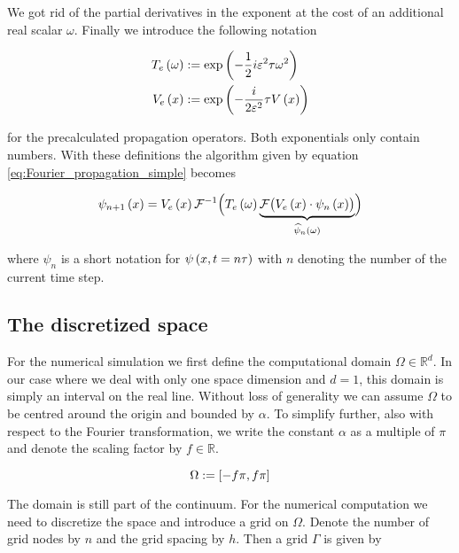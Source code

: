 We got rid of the partial derivatives in the exponent at the cost of an additional
real scalar $\omega$. Finally we introduce the following notation

\begin{equation} \label{eq:def_Fourier_operator_exponentials}
\begin{split}
  T_e\left( \omega \right) & := \exp\left( -\frac{1}{2}i\varepsilon^2\tau\omega^2 \right) \\
  V_e\left( x \right)      & := \exp\left( -\frac{i}{2\varepsilon^2}\tau V\left( x \right) \right)
\end{split}
\end{equation}

for the precalculated propagation operators. Both exponentials only contain numbers.
With these definitions the algorithm given by equation \eqref{eq:Fourier_propagation_simple} becomes

\begin{equation} \label{eq:Fourier_propagation_alg}
  \psi_{n+1}\left( x \right) =
  V_e\left( x \right) \mathcal{F}^{-1} \Bigl(
    T_e\left( \omega \right) \underbrace{ \mathcal{F}\bigl(
      V_e\left( x \right) \cdot \psi_n\left( x \right)
    \bigr)}_{\widehat{\psi}_n\left( \omega \right)}
  \Bigr)
\end{equation}

where $\psi_n$ is a short notation for $\psi\left( x, t = n\tau \right)$ with $n$
denoting the number of the current time step.


\subsection{The discretized space}

For the numerical simulation we first define the computational
domain $\Omega \in \mathbb{R}^d$. In our case where we deal with only one space
dimension and $d=1$, this domain is simply an interval on the real line. Without
loss of generality we can assume $\Omega$ to be centred around the origin and bounded
by $\alpha$. To simplify further, also with respect to the Fourier transformation,
we write the constant $\alpha$ as a multiple of $\pi$ and denote the scaling factor
by $f \in \mathbb{R}$.

\begin{equation} \label{eq:comp_domain}
  \Omega := \left[ -f \pi, f \pi \right]
\end{equation}

The domain is still part of the continuum. For the numerical computation we need
to discretize the space and introduce a grid on $\Omega$. Denote the number of grid
nodes by $n$ and the grid spacing by $h$. Then a grid $\Gamma$ is given by

